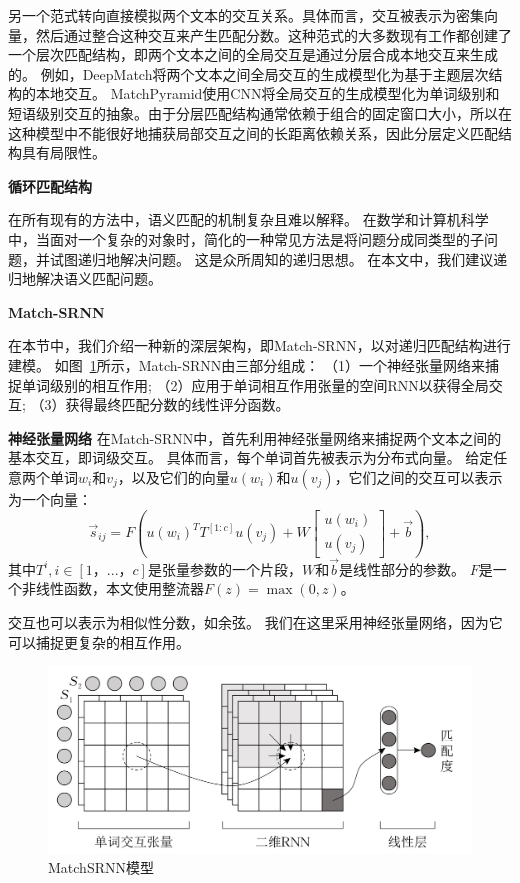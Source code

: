 另一个范式转向直接模拟两个文本的交互关系。具体而言，交互被表示为密集向量，然后通过整合这种交互来产生匹配分数。这种范式的大多数现有工作都创建了一个层次匹配结构，即两个文本之间的全局交互是通过分层合成本地交互来生成的。
例如，DeepMatch将两个文本之间全局交互的生成模型化为基于主题层次结构的本地交互。 MatchPyramid使用CNN将全局交互的生成模型化为单词级别和短语级别交互的抽象。由于分层匹配结构通常依赖于组合的固定窗口大小，所以在这种模型中不能很好地捕获局部交互之间的长距离依赖关系，因此分层定义匹配结构具有局限性。

\textbf{循环匹配结构}

在所有现有的方法中，语义匹配的机制复杂且难以解释。
在数学和计算机科学中，当面对一个复杂的对象时，简化的一种常见方法是将问题分成同类型的子问题，并试图递归地解决问题。 这是众所周知的递归思想。 在本文中，我们建议递归地解决语义匹配问题。
%
%


\textbf{Match-SRNN}

在本节中，我们介绍一种新的深层架构，即Match-SRNN，以对递归匹配结构进行建模。 如图~\ref{fig:architecture}所示，Match-SRNN由三部分组成：
（1）一个神经张量网络来捕捉单词级别的相互作用; （2）应用于单词相互作用张量的空间RNN以获得全局交互; （3）获得最终匹配分数的线性评分函数。

\textbf{神经张量网络}
在Match-SRNN中，首先利用神经张量网络来捕捉两个文本之间的基本交互，即词级交互。
具体而言，每个单词首先被表示为分布式向量。 给定任意两个单词$ w_i $和$ v_j $，以及它们的向量$ u(w_i)$和$ u(v_j)$，它们之间的交互可以表示为一个向量：
\begin{equation*}
\vec{s}_{ij}=F(u(w_i)^TT^{[1:c]}u(v_j)+W\begin{bmatrix}
		u(w_i)\\
		u(v_j)
	\end{bmatrix}+\vec{b}),
\end{equation*}
其中$ T^i, i \in [1，...，c] $是张量参数的一个片段，$ W $和$ \vec{b} $是线性部分的参数。 $ F $是一个非线性函数，本文使用整流器$ F(z)= \max(0,z)$。

交互也可以表示为相似性分数，如余弦。 我们在这里采用神经张量网络，因为它可以捕捉更复杂的相互作用。
\begin{figure}[!htbp]
\vspace{1em}
\centering
  \includegraphics[width=0.9\linewidth]{figures/MatchSRNN.jpg}
  \caption{MatchSRNN模型}
  \label{fig:architecture}       %
\vspace{1em}
\end{figure}



